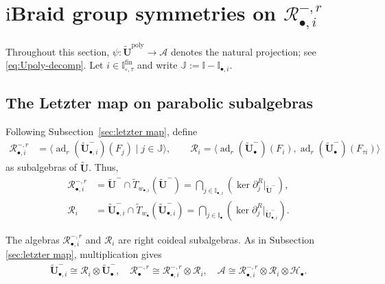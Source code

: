 \documentclass[a4paper,reqno,12pt]{amsart}
\numberwithin{equation}{section}
\theoremstyle{definition}
\theoremstyle{plain}
\theoremstyle{definition}
\def\I{\mathbb I}
\def\J{\mathbb J}
\def\bI{\I_\bullet}
\def\bIi{\I_{\bullet,i}}
\def\bw{w_\bullet}
\def\bwi{w_{\bullet,i}}
\def\tU{\widetilde{\mathbf U}}
\def \tbU{\tU_{\bullet}}
\def \tbiU{\tU_{\bullet,i}}
\def\tTD{\widetilde T}
\def\cA{\mathcal A}
\def\cR{\mathcal R}
\def\cH{\mathcal H}
\def \wItau{\I_{\circ,\tau}}
\def \fwItau{\wItau^{\mathrm{fin}}}
\newcommand{\ad}{\operatorname{ad}}
\newcommand{\poly}{\mathrm{poly}}
\begin{document}
\section{\texorpdfstring{$\mathrm i$}{i}Braid group symmetries on \texorpdfstring{$\cR_{\bullet,i}^{-,r}$}{R}}
\label{sec:R}

Throughout this section, $\psi:\tU^\poly\rightarrow \cA$ denotes the natural projection; see \eqref{eq:Upoly-decomp}. Let $i\in\fwItau$ and write $\J:=\I-\bIi$. %
\subsection{The Letzter map on parabolic subalgebras}
Following Subsection~\ref{sec:letzter map}, define
\begin{align}\label{eq:generator of radicals}
\cR_{\bullet,i}^{-,r}&=\langle\ad_r(\tbiU^-)(F_j)\mid j\in\J\rangle,\qquad \cR_i= \langle\ad_r(\tbU^-)(F_i),\ad_r(\tbU^-)(F_{\tau i})\rangle\end{align}
   as subalgebras of $\tU$.
   Thus,
   \begin{align}
  \cR_{\bullet,i}^{-,r}  &=\tU^-\cap\tTD_{\bwi}(\tU^-)=\bigcap_{j\in\bIi}(\ker\partial_j^R|_{\tU^-}),\label{eq:radicals} \\
    \cR_i&=\tbiU^-\cap\tTD_{\bw}(\tbiU^-)=\bigcap_{j\in\bI}(\ker\partial_j^R|_{\tbiU^-})
\label{eq:local-radicals}.
\end{align}

The algebras $\cR_{\bullet,i}^{-,r}$ and $\cR_i$ are right coideal subalgebras. As in Subsection \ref{sec:letzter map}, multiplication gives
\begin{align}
    \tbiU^-\cong\cR_i\otimes\tbU^-,\quad\cR_\bullet^{-,r}\cong\cR_{\bullet,i}^{-,r}\otimes\cR_i,\quad \cA\cong\cR_{\bullet,i}^{-,r}\otimes\cR_i\otimes\cH_\bullet.
\label{eq:decomposition}
\end{align}
\end{document}
